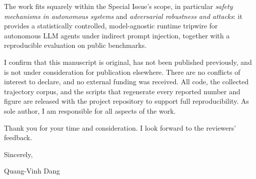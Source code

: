 \documentclass[11pt]{article}
\begin{document}
The work fits squarely within the Special Issue's scope, in particular
\emph{safety mechanisms in autonomous systems} and \emph{adversarial robustness
and attacks}: it provides a statistically controlled, model-agnostic runtime
tripwire for autonomous LLM agents under indirect prompt injection, together
with a reproducible evaluation on public benchmarks.

I confirm that this manuscript is original, has not been published previously,
and is not under consideration for publication elsewhere. There are no conflicts
of interest to declare, and no external funding was received. All code, the
collected trajectory corpus, and the scripts that regenerate every reported
number and figure are released with the project repository to support full
reproducibility. As sole author, I am responsible for all aspects of the work.

Thank you for your time and consideration. I look forward to the reviewers'
feedback.

\vspace{0.8em}
\noindent Sincerely,

\vspace{0.4em}
\noindent Quang-Vinh Dang
\end{document}

